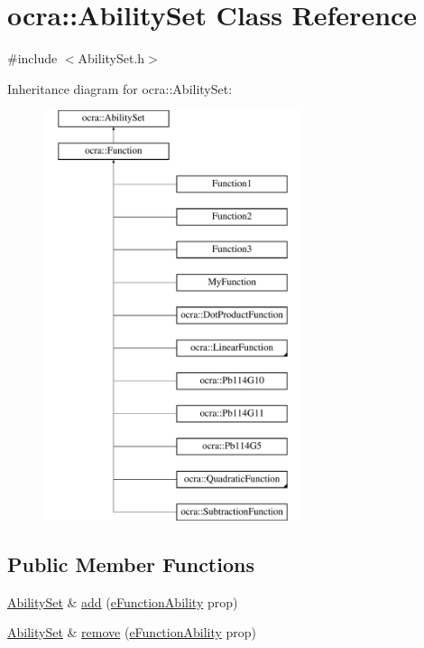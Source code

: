 \hypertarget{classocra_1_1AbilitySet}{}\section{ocra\+:\+:Ability\+Set Class Reference}
\label{classocra_1_1AbilitySet}


{\ttfamily \#include $<$Ability\+Set.\+h$>$}

Inheritance diagram for ocra\+:\+:Ability\+Set\+:\begin{figure}[H]
\begin{center}
\leavevmode
\includegraphics[height=12.000000cm]{d8/d24/classocra_1_1AbilitySet}
\end{center}
\end{figure}
\subsection*{Public Member Functions}
\begin{DoxyCompactItemize}
\item 
\hyperlink{classocra_1_1AbilitySet}{Ability\+Set} \& \hyperlink{classocra_1_1AbilitySet_a4ce141c59ed38f812a4216730a0c4685}{add} (\hyperlink{namespaceocra_a40ddbec106a6034cd2047bba9945b568}{e\+Function\+Ability} prop)
\item 
\hyperlink{classocra_1_1AbilitySet}{Ability\+Set} \& \hyperlink{classocra_1_1AbilitySet_a093633f29e0d5e6a388d9b8cba9224c7}{remove} (\hyperlink{namespaceocra_a40ddbec106a6034cd2047bba9945b568}{e\+Function\+Ability} prop)
\end{DoxyCompactItemize}
